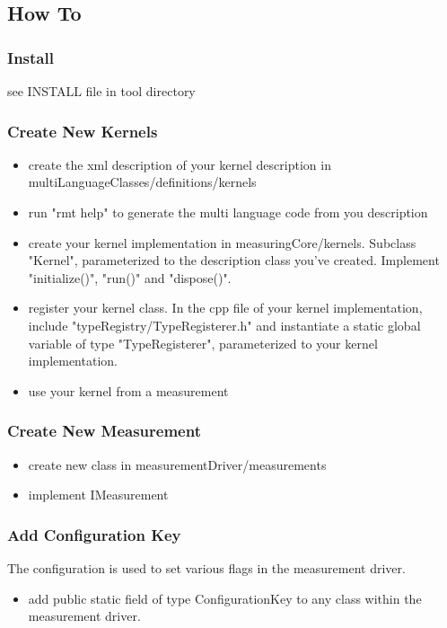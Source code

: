 \documentclass[a4paper,12pt]{article}
\begin{document}
\subsection{How To}
\subsubsection{Install}
see INSTALL file in tool directory

\subsubsection{Create New Kernels}
\begin{itemize}
\item create the xml description of your kernel description in multiLanguageClasses/definitions/kernels
\item run "rmt help" to generate the multi language code from you description
\item create your kernel implementation in measuringCore/kernels. Subclass "Kernel", parameterized to the description class you've created. Implement "initialize()", "run()" and "dispose()".
\item register your kernel class. In the cpp file of your kernel implementation, include "typeRegistry/TypeRegisterer.h" and instantiate a static global variable of type "TypeRegisterer", parameterized to your kernel implementation.
\item use your kernel from a measurement
\end{itemize}

\subsubsection{Create New Measurement}
\begin{itemize}
\item create new class in measurementDriver/measurements
\item implement IMeasurement
\end{itemize}

\subsubsection{Add Configuration Key}
The configuration is used to set various flags in the measurement driver.
\begin{itemize}
\item add public static field of type ConfigurationKey to any class within the measurement driver.
\end{itemize}
\end{document}
